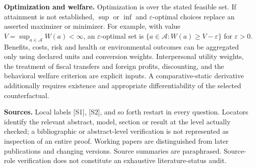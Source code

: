 \documentclass[11pt,a4paper]{article}
\begin{document}
\textbf{Optimization and welfare.} Optimization is over the stated feasible set. If attainment is not established, $\sup$ or $\inf$ and $\varepsilon$-optimal choices replace an asserted maximizer or minimizer. For example, with value $V=\sup_{a\in\mathcal A}W(a)<\infty$, an $\varepsilon$-optimal set is $\{a\in\mathcal A:W(a)\geq V-\varepsilon\}$ for $\varepsilon>0$. Benefits, costs, risk and health or environmental outcomes can be aggregated only using declared units and conversion weights. Interpersonal utility weights, the treatment of fiscal transfers and foreign profits, discounting, and the behavioral welfare criterion are explicit inputs. A comparative-static derivative additionally requires existence and appropriate differentiability of the selected counterfactual.

\textbf{Sources.} Local labels [S1], [S2], and so forth restart in every question. Locators identify the relevant abstract, model, section or result at the level actually checked; a bibliographic or abstract-level verification is not represented as inspection of an entire proof. Working papers are distinguished from later publications and changing versions. Source summaries are paraphrased. Source-role verification does not constitute an exhaustive literature-status audit.
\end{document}

